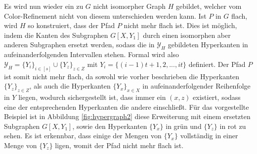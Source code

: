 Es wird nun wieder ein zu $G$ nicht isomorpher Graph $H$ gebildet, welcher vom Color-Refinement nicht von diesem unterschieden werden kann.
Ist $P$ in $G$ flach, wird $H$ so konstruiert, dass der Pfad $P$ nicht mehr flach ist.
Dies ist möglich, indem die Kanten des Subgraphen $G[X,Y_1]$ durch einen isomorphen aber anderen Subgraphen ersetzt werden, sodass die in $\mathcal{Y}_H$ gebildeten Hyperkanten in aufeinanderfolgenden Intervallen stehen.
Formal wird also $\mathcal{Y}_H=\{Y_i\}_{i\in [s]}\cup \{Y_z\}_{z\in Z}$ mit $Y_i=\{(i-1)t+1,2,...,it\}$ definiert.
Der Pfad $P$ ist somit nicht mehr flach, da sowohl wie vorher beschrieben die Hyperkanten $\{Y_z\}_{z\in Z}$, als auch die Hyperkanten $\{Y_x\}_{x\in X}$ in aufeinanderfolgender Reihenfolge in $Y$ liegen, wodurch sichergestellt ist, dass immer ein $(x,z)$ existiert, sodass eine der entsprechenden Hyperkanten die andere einschließt.
Für das vorgestellte Beispiel ist in Abbildung \ref{fig:hypergraph2} diese Erweiterung mit einem ersetzten Subgraphen $G[X,Y_1]$, sowie den Hyperkanten $\{Y_x\}$ in grün und $\{Y_z\}$ in rot zu sehen.
Es ist erkennbar, dass einige der Mengen von $\{Y_x\}$ vollständig in einer Menge von $\{Y_z\}$ ligen, womit der Pfad nicht mehr flach ist.

